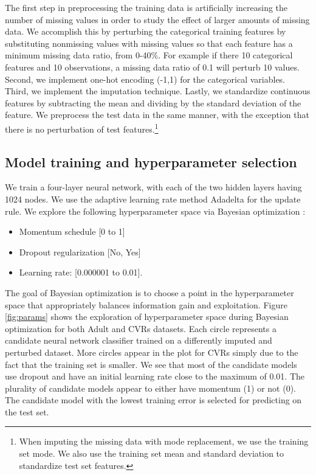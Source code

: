\documentclass[10pt,twocolumn,letterpaper]{article}
\begin{document}
The first step in preprocessing the training data is artificially increasing the number of missing values in order to study the effect of larger amounts of missing data. We accomplish this by perturbing the categorical training features by substituting nonmissing values with missing values so that each feature has a minimum missing data ratio, from 0-40\%. For example if there 10 categorical features and 10 observations, a missing data ratio of 0.1 will perturb 10 values. Second, we implement one-hot encoding (-1,1) for the categorical variables. Third, we implement the imputation technique. Lastly, we standardize continuous features by subtracting the mean and dividing by the standard deviation of the feature. We preprocess the test data in the same manner, with the exception that there is no perturbation of test features.\footnote{When imputing the missing data with mode replacement, we use the training set mode. We also use the training set mean and standard deviation to standardize test set features.}

\subsection{Model training and hyperparameter selection} \label{hyper}

We train a four-layer neural network, with each of the two hidden layers having 1024 nodes. We use the adaptive learning rate method Adadelta \cite{zeiler2012} for the update rule. We explore the following hyperparameter space via Bayesian optimization \cite{snoek2012}:

\begin{itemize}
\item Momentum schedule [0 to 1]
\item Dropout regularization [No, Yes]
\item Learning rate: [0.000001 to 0.01].
\end{itemize}

The goal of Bayesian optimization is to choose a point in the hyperparameter space that appropriately balances information gain and exploitation. Figure \ref{fig:params} shows the exploration of hyperparameter space during Bayesian optimization for both Adult and CVRs datasets. Each circle represents a candidate neural network classifier trained on a differently imputed and perturbed dataset. More circles appear in the plot for CVRs simply due to the fact that the training set is smaller. We see that most of the candidate models use dropout and have an initial learning rate close to the maximum of 0.01. The plurality of candidate models appear to either have momentum (1) or not (0). The candidate model with the lowest training error is selected for predicting on the test set. 
\end{document}
